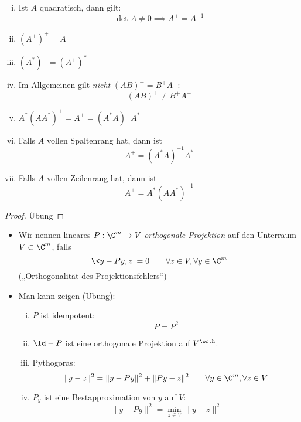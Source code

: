 \documentclass[11pt]{scrbook}
\begin{document}
\begin{st}[Eigenschaften]
	\label{1.41}
	\begin{enumerate}[i)]
		\item
			Ist $A$ quadratisch, dann gilt:
			\[
				\det A \neq 0 \implies A^+ = A^{-1}
			\]
		\item
			$(A^+)^+ = A$
		\item
			$(A^*)^+ = (A^+)^*$
		\item
			Im Allgemeinen gilt \emph{nicht} $(AB)^+ = B^+A^+$:
			\[
				(AB)^+ \neq B^+A^+
			\]
		\item
			$A^*(AA^*)^+ = A^+ = (A^*A)^+ A^*$
		\item
			Falls $A$ vollen Spaltenrang hat, dann ist
			\[
				A^+ = (A^*A)^{-1}A^*
			\]
		\item
			Falls $A$ vollen Zeilenrang hat, dann ist
			\[
				A^+ = A^*(AA^*)^{-1}
			\]
	\end{enumerate}
	\begin{proof}
		Übung
	\end{proof}
\end{st}

\begin{nt*}
	\begin{itemize}
		\item
			Wir nennen lineares $P: \C^m \to V$ \emph{orthogonale Projektion} auf den Unterraum $V\subset \C^m$, falls
			\[
				\<y- Py,z\> = 0 \qquad \forall z\in V, \forall y\in \C^m
			\]
			(„Orthogonalität des Projektionsfehlers“)
		\item
			Man kann zeigen (Übung):
			\begin{enumerate}[i)]
				\item
					$P$ ist idempotent:
					\[
						P = P^2
					\]
				\item
					$\Id - P$ ist eine orthogonale Projektion auf $V^\orth$.
				\item
					Pythogoras:
					\[
						\|y-z\|^2 = \|y-Py\|^2 + \|Py-z\|^2 
						\qquad \forall y\in \C^m,\forall z\in V
					\]
				\item
					$P_y$ ist eine Bestapproximation von $y$ auf $V$:
					\[
						\|y-Py\|^2 = \min_{z\in V}\|y-z\|^2
					\]
			\end{enumerate}
	\end{itemize}
\end{nt*}
\end{document}
